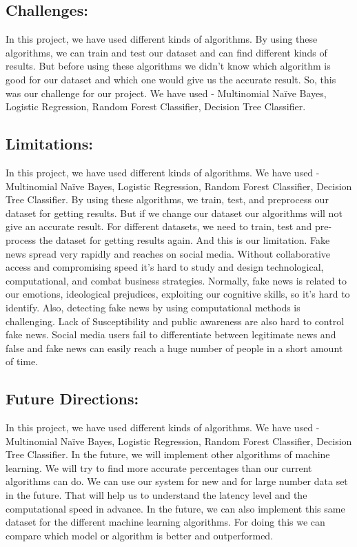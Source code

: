\documentclass{article}
\begin{document}
       \subsection{Challenges:}
   In this project, we have used different kinds of algorithms. By using these algorithms, we can train and test our dataset and can find different kinds of results. But before using these algorithms we didn’t know which algorithm is good for our dataset and which one would give us the accurate result. So, this was our challenge for our project. We have used - Multinomial Naïve Bayes, Logistic Regression, Random Forest Classifier, Decision Tree Classifier.
       \subsection{Limitations:}
        In this project, we have used different kinds of algorithms. We have used - Multinomial Naïve Bayes, Logistic Regression, Random Forest Classifier, Decision Tree Classifier. By using these algorithms, we train, test, and preprocess our dataset for getting results. But if we change our dataset our algorithms will not give an accurate result. For different datasets, we need to train, test and pre-process the dataset for getting results again. And this is our limitation.
Fake news spread very rapidly and reaches on social media. Without collaborative access and compromising speed it's hard to study and design technological, computational, and combat business strategies. Normally, fake news is related to our emotions, ideological prejudices, exploiting our cognitive skills, so it's hard to identify. Also, detecting fake news by using computational methods is challenging. Lack of Susceptibility and public awareness are also hard to control fake news. Social media users fail to differentiate between legitimate news and false and fake news can easily reach a huge number of people in a short amount of time. 

          \subsection{Future Directions:}
        In this project, we have used different kinds of algorithms. We have used - Multinomial Naïve Bayes, Logistic Regression, Random Forest Classifier, Decision Tree Classifier. In the future, we will implement other algorithms of machine learning. We will try to find more accurate percentages than our current algorithms can do. We can use our system for new and for large number data set in the future. That will help us to understand the latency level and the computational speed in advance. In the future, we can also implement this same dataset for the different machine learning algorithms. For doing this we can compare which model or algorithm is better and outperformed.
\end{document}
